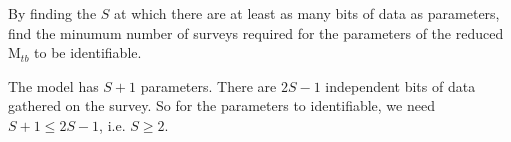 \begin{questions}
\begin{parts}
{\begin{solution}
\end{solution}}

\item By finding the $S$ at which there are at least as many bits of data as parameters, find the minumum number of surveys required for the parameters of the reduced M$_{tb}$ to be identifiable.

{\begin{solution}
The model has $S+1$ parameters. There are $2S-1$ independent bits of data gathered on the survey. So for the parameters to identifiable, we need $S+1\leq 2S-1$, i.e. $S\geq 2$.
\end{solution}}

\end{parts}

\end{questions}

